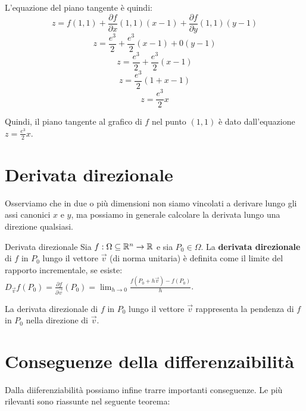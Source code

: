 L'equazione del piano tangente è quindi:
\[
z = f(1,1) + \frac{\partial f}{\partial x}(1,1)(x-1) + \frac{\partial f}{\partial y}(1,1)(y-1)
\]
\[
z = \frac{e^{3}}{2} + \frac{e^{3}}{2}(x-1) + 0(y-1)
\]
\[
z = \frac{e^{3}}{2} + \frac{e^{3}}{2}(x-1)
\]
\[
z = \frac{e^{3}}{2}(1 + x - 1)
\]
\[
z = \frac{e^{3}}{2}x
\]

Quindi, il piano tangente al grafico di $f$ nel punto $(1,1)$ è dato dall'equazione $z = \frac{e^{3}}{2}x$.\\

\section{Derivata direzionale}
Osserviamo che in due o più dimensioni non siamo vincolati a derivare lungo gli assi canonici $x$ e $y$, ma possiamo in generale calcolare la derivata lungo una direzione qualsiasi.
\begin{definizione}{Derivata direzionale}
Sia $f:\Omega \subseteq \mathbb{R}^n \rightarrow \mathbb{R}$ e sia $P_0 \in \Omega$. La \textbf{derivata direzionale} di $f$ in $P_0$ lungo il vettore $\vec v$ (di norma unitaria) è definita come il limite del rapporto incrementale, se esiste: $D_{\vec v}f(P_0) = \frac{\partial f}{\partial \vec v}(P_0) = \lim_{h \to 0} \frac{f(P_0 + h\vec v) - f(P_0)}{h}$.
\end{definizione}

\begin{osservazione}{}
La derivata direzionale di $f$ in $P_0$ lungo il vettore $\vec v$ rappresenta la pendenza di $f$ in $P_0$ nella direzione di $\vec v$. \\
\end{osservazione}


\section{Conseguenze della differenzaibilità}
Dalla diiferenziabilità possiamo infine trarre importanti conseguenze. Le più rilevanti sono riassunte nel seguente teorema:

